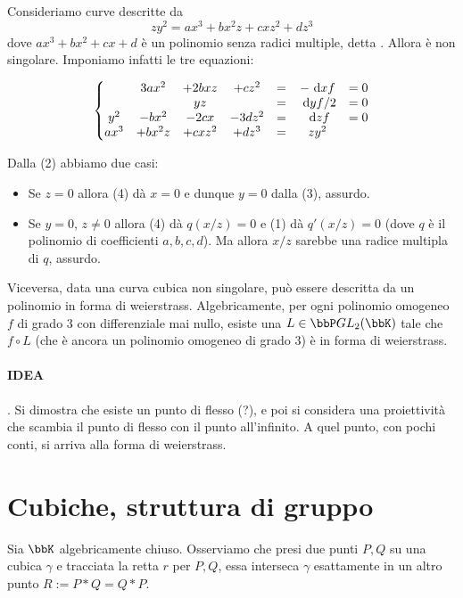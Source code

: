 Consideriamo curve descritte da
$$ zy^2= ax^3+bx^2z+cxz^2+dz^3 $$
 dove $ax^3+bx^2+cx+d$ è un polinomio senza radici multiple, detta . Allora è non singolare. Imponiamo infatti le tre equazioni:


$$ \left\{ 
\begin{matrix}
&3ax^2&+2bxz&+cz^2 & = & -\text{ d}{x}f & = 0 \\
&&yz& & = & \text{ d}{y}f / 2 &= 0 \\
y^2 &-bx^2&-2cx&-3dz^2 & = & \text{ d}{z}f& = 0 \\
ax^3&+bx^2z&+cxz^2&+dz^3& = & zy^2&
\end{matrix}
\right.$$

Dalla (2) abbiamo due casi:

\begin{itemize}
	\item Se $z=0$ allora (4) dà $x=0$ e dunque $y=0$ dalla (3), assurdo.

	\item Se $y = 0$, $z \neq 0$ allora (4) dà $q(x/z) = 0$ e (1) dà $q'(x/z) = 0$ (dove $q$ è il polinomio di coefficienti $a,b,c,d$). Ma allora $x/z$ sarebbe una radice multipla di $q$, assurdo.  
\end{itemize}

Viceversa, data una curva cubica non singolare, può essere descritta da un polinomio in forma di weierstrass. Algebricamente, per ogni polinomio omogeneo $f$ di grado 3 con differenziale mai nullo, esiste una $L \in \bbP GL_2(\bbK) $ tale che $f \circ L$ (che è ancora un polinomio omogeneo di grado 3) è in forma di weierstrass. 
\paragraph{IDEA}. Si dimostra che esiste un punto di flesso (?), e poi si considera una proiettività che scambia il  punto di flesso con il punto all'infinito. A quel punto, con pochi conti, si arriva alla forma di weierstrass.

\section{Cubiche, struttura di gruppo}

Sia $\bbK$ algebricamente chiuso. Osserviamo che presi due punti $P,Q$ su una cubica $\gamma$ e tracciata la retta $r$ per $P,Q$, essa interseca $\gamma$ esattamente in un altro punto $R:=P * Q = Q*P$. 

